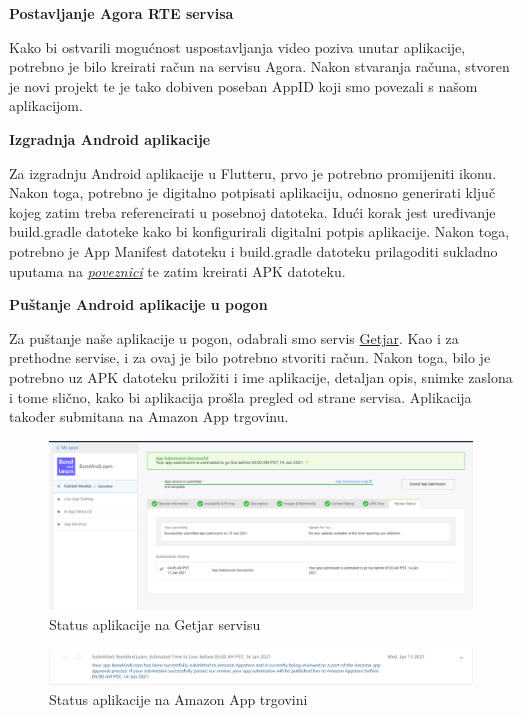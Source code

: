 			\begin{flushleft}
				\textbf{Postavljanje Agora RTE servisa} 
			\end{flushleft}
		
			\text Kako bi ostvarili mogućnost uspostavljanja video poziva unutar aplikacije, potrebno je bilo kreirati račun na servisu Agora. Nakon stvaranja računa, stvoren je novi projekt te je tako dobiven poseban AppID koji smo povezali s našom aplikacijom.  
			
			\begin{flushleft}
				\textbf{Izgradnja Android aplikacije} 
			\end{flushleft}
			
			\text Za izgradnju Android aplikacije u Flutteru, prvo je potrebno promijeniti ikonu. Nakon toga, potrebno je digitalno potpisati aplikaciju, odnosno generirati ključ kojeg zatim treba referencirati u posebnoj datoteka. Idući korak jest uređivanje build.gradle datoteke kako bi konfigurirali digitalni potpis aplikacije. Nakon toga, potrebno je App Manifest datoteku i build.gradle datoteku prilagoditi sukladno uputama na \textit{\href{https://flutter.dev/docs/deployment/android}{poveznici}} te  zatim kreirati APK datoteku. 
			
			\begin{flushleft}
				\textbf{Puštanje Android aplikacije u pogon} 
			\end{flushleft}
			
			\text Za puštanje naše aplikacije u pogon, odabrali smo servis \href{https://developer.getjar.mobi/}{Getjar}. Kao i za prethodne servise, i za ovaj je bilo potrebno stvoriti račun. Nakon toga, bilo je potrebno uz APK datoteku priložiti i ime aplikacije, detaljan opis, snimke zaslona i tome slično, kako bi aplikacija prošla pregled od strane servisa. Aplikacija također submitana na Amazon App trgovinu. 
			\eject
			\begin{figure}[h]
				\includegraphics[scale=0.3]{slike/Getjar.PNG}
				\centering
				\caption{Status aplikacije na Getjar servisu}
				\label{fig:Getjar}
			\end{figure}
			
			\begin{figure}[h]
				\includegraphics[scale=0.2]{slike/Amazon.JPEG}
				\centering
				\caption{Status aplikacije na Amazon App trgovini}
				\label{fig:Amazon}
			\end{figure}
			
			\eject 